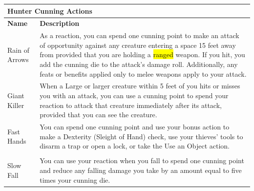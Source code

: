 \begin{multicols*}{2}
\end{multicols*}


\clearpage

\begin{table}[ht!]
\begin{small}
\begin{center}
\begin{tabular}{ll}
\multicolumn{2}{l}{\parbox[l][0.6cm][c]{15cm}{\textbf{Hunter Cunning Actions}}} 
\\
\hline 
\textbf{Name} & \parbox[l][0.6cm][c]{15cm}{\textbf{Description}}
\\ 
Rain of Arrows & \parbox[l][1.8cm][c]{15cm}{
As a reaction, you can spend one cunning point to make an attack of opportunity against any creature entering a space 15 feet away from provided that you are holding a \hl{ranged} weapon.  If you hit, you add the cunning die to the attack's damage roll. Additionally, any feats or benefits applied only to melee weapons apply to your attack.
}
\\ 
Giant Killer & \parbox[l][1.2cm][c]{15cm}{
When a Large or larger creature within 5 feet of you hits or misses you with an attack, you can use a cunning point to spend your reaction to attack that creature immediately after its attack, provided that you can see the creature.
}
\\ 
Fast Hands & \parbox[l][1.8cm][c]{15cm}{
You can spend one cunning point and use your bonus action to make a Dexterity (Sleight of Hand) check, use your thieves' tools to disarm a trap or open a lock, or take the Use an Object action.
}
\\

}
\\
Slow Fall & \parbox[l][1.2cm][c]{15cm}{
You can use your reaction when you fall to spend one cunning point and reduce any falling damage you take by an amount equal to five times your cunning die.
}
\\
\hline
\end{tabular}
\end{center}
\end{small}
\end{table} 

    